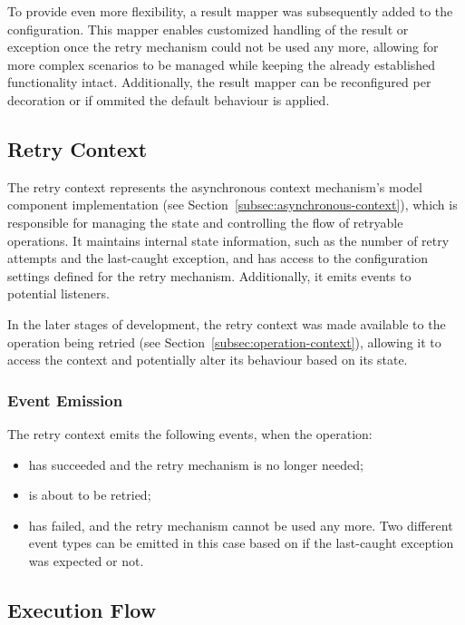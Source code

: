 To provide even more flexibility, a result mapper was subsequently added to the configuration.
This mapper enables customized handling of the result or exception once the retry mechanism could not be used any more,
allowing for more complex scenarios to be managed while keeping the already established functionality intact.
Additionally, the result mapper can be reconfigured per decoration or if ommited the default behaviour is applied.

\subsection{Retry Context}\label{subsec:retry-context}

The retry context represents the asynchronous context mechanism's model component implementation
(see Section~\ref{subsec:asynchronous-context}),
which is responsible for managing the state and controlling the flow of retryable operations.
It maintains internal state information, such as the number of retry attempts and the last-caught exception,
and has access to the configuration settings defined for the retry mechanism.
Additionally, it emits events to potential listeners.

In the later stages of development,
the retry context was made available to the operation being retried (see Section~\ref{subsec:operation-context}),
allowing it to access the context and potentially alter its behaviour based on its state.

\subsubsection{Event Emission}\label{subsubsec:retry-context-event-emission}

The retry context emits the following events, when the operation:

\begin{itemize}
    \item has succeeded and the retry mechanism is no longer needed;
    \item is about to be retried;
    \item has failed, and the retry mechanism cannot be used any more.
    Two different event types can be emitted in this case based on if the last-caught exception was expected or not.
\end{itemize}

\subsection{Execution Flow}\label{subsec:retry-execution-flow}

